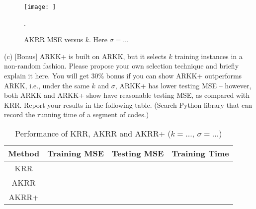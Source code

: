 \documentclass{llncs}
\begin{document}
\begin{figure}[h!] 
\centering 
\texttt{[image: ]} 
\caption{AKRR MSE versus $k$. Here $\sigma = \ldots$}. 
\end{figure}

(c) [Bonus] ARKK+ is built on ARKK, but it selects $k$ 
training instances in a non-random fashion. Please propose 
your own selection technique and briefly explain it here. 
You will get 30\% bonus if you can show ARKK+ outperforms 
ARKK, i.e., under the same $k$ and $\sigma$, ARKK+ has 
lower testing MSE -- however, both ARKK and ARKK+ show 
have reasonable testing MSE, as compared with KRR. 
Report your results in the following table. 
(Search Python library that can record the running 
time of a segment of codes.)  

\begin{table}
\centering
\caption{Performance of KRR, AKRR and AKRR+ 
($k=...$, $\sigma = ...$)}
\setlength{\tabcolsep}{20pt} %
\def\arraystretch{2.5} %
\begin{tabular}{c|c|c|c}
\hline 
\bf Method & \bf Training MSE & \bf Testing MSE & 
\bf Training Time \\ \hline 
KRR & & \\ \hline 
AKRR & & \\ \hline
AKRR+ & & \\ \hline 
\end{tabular}
\end{table}
\end{document}
